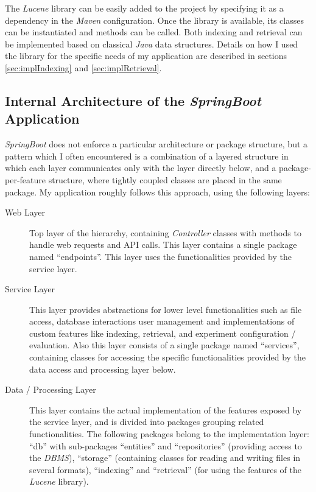 \documentclass[a4paper]{usiinfbachelorproject}
\begin{document}
The \emph{Lucene} library can be easily added to the project by specifying it as a dependency in the \emph{Maven} configuration.
Once the library is available, its classes can be instantiated and methods can be called. Both indexing and retrieval can
be implemented based on classical \emph{Java} data structures. Details on how
I used the library for the specific needs of my application are described in sections \ref{sec:implIndexing} 
and \ref{sec:implRetrieval}.

\subsection{\textbf{Internal Architecture of the \emph{SpringBoot} Application}} \label{sec:archBackend}

\emph{SpringBoot} does not enforce a particular architecture or package structure, but a pattern which I often encountered is a combination
of a layered structure in which each layer communicates only with the layer directly below, and a package-per-feature structure, where
tightly coupled classes are placed in the same package. My application roughly follows this approach, using the following layers:

    \begin{description}

        \item[Web Layer]
        Top layer of the hierarchy, containing \emph{Controller} classes with methods to handle web requests and API calls.
        This layer contains a single package named ``endpoints''. This layer uses the functionalities provided by the service layer.

        \item[Service Layer]
        This layer provides abstractions for lower level functionalities such as file access, database interactions user management and
        implementations of custom features like indexing, retrieval, and experiment configuration / evaluation.
        Also this layer consists of a single package named ``services'', containing classes for accessing the specific functionalities
        provided by the data access and processing layer below.

        \item[Data / Processing Layer]
        This layer contains the actual implementation of the features exposed by the service layer, and is divided into packages 
        grouping related functionalities. The following packages belong to the implementation layer:
        ``db'' with sub-packages ``entities'' and ``repositories'' (providing access to the \emph{DBMS}), 
        ``storage'' (containing classes for reading and writing files in several formats),  
        ``indexing'' and ``retrieval'' (for using the features of the \emph{Lucene} library).

    \end{description}
\end{document}
